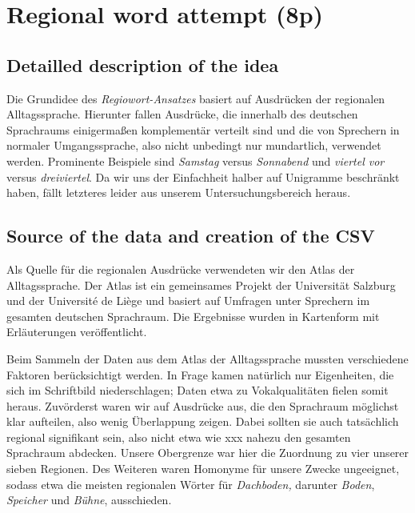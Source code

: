 \documentclass[../Main.tex]{subfiles}
\begin{document}
\section{Regional word attempt (8p)}
\subsection{Detailled description of the idea}
Die Grundidee des \textit{Regiowort-Ansatzes} basiert auf Ausdrücken der regionalen Alltagssprache. Hierunter fallen Ausdrücke, die innerhalb des deutschen Sprachraums einigermaßen komplementär verteilt sind und die von Sprechern in normaler Umgangssprache, also nicht unbedingt nur mundartlich, verwendet werden. Prominente Beispiele sind \textit{Samstag} versus \textit{Sonnabend} und \textit{viertel vor} versus \textit{dreiviertel}. Da wir uns der Einfachheit halber auf Unigramme beschränkt haben, fällt letzteres leider aus unserem Untersuchungsbereich heraus.

\subsection{Source of the data and creation of the CSV}
Als Quelle für die regionalen Ausdrücke verwendeten wir den Atlas der Alltagssprache. Der Atlas ist ein gemeinsames Projekt der Universität Salzburg und der Université de Liège und basiert auf Umfragen unter Sprechern im gesamten deutschen Sprachraum. Die Ergebnisse wurden in Kartenform mit Erläuterungen veröffentlicht.


Beim Sammeln der Daten aus dem Atlas der Alltagssprache mussten verschiedene Faktoren berücksichtigt werden. In Frage kamen natürlich nur Eigenheiten, die sich im Schriftbild niederschlagen; Daten etwa zu Vokalqualitäten fielen somit heraus. Zuvörderst waren wir auf Ausdrücke aus, die den Sprachraum möglichst klar aufteilen, also wenig Überlappung zeigen. Dabei sollten sie auch tatsächlich regional signifikant sein, also nicht etwa wie xxx nahezu den gesamten Sprachraum abdecken. Unsere Obergrenze war hier die Zuordnung zu vier unserer sieben Regionen. Des Weiteren waren Homonyme für unsere Zwecke ungeeignet, sodass etwa die meisten regionalen Wörter für \textit{Dachboden,} darunter \textit{Boden}, \textit{Speicher} und \textit{Bühne}, ausschieden.
\end{document}

